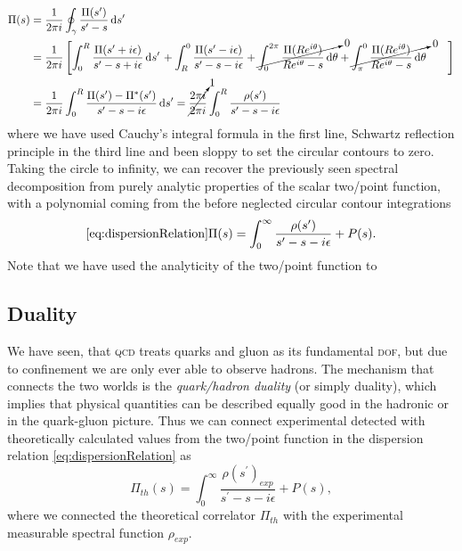 \documentclass[../../index.tex]{subfiles}
\begin{document}
\begin{equation}
  \begin{split}
    \Pi(s) &= \frac{1}{2\pi i}\oint_\gamma \frac{\Pi(s^\prime)}{s^\prime-s} \dif s^\prime \\
    &= \frac{1}{2\pi i} \left[ \int_0^R
      \frac{\Pi(s^\prime+i\epsilon)}{s^\prime-s+i\epsilon}\dif s^\prime \right.
    + \int_R^0 \frac{\Pi(s^\prime - i\epsilon)}{s^\prime-s-i\epsilon} +
    \cancelto{0}{\int_0^{2\pi} \frac{\Pi(R e^{i\theta})}{Re^{i\theta}-s}\dif
      \theta}
    + \cancelto{0}{ \int_\pi^0 \frac{\Pi(R e^{i\theta})}{Re^{i\theta}-s}\dif \theta} \left. \phantom{\int_0^R} \right] \\
    &= \frac{1}{2\pi i}\int_0^R \frac{\Pi(s^\prime) -
      \Pi^*(s^\prime)}{s^\prime-s-i\epsilon} \dif s^\prime =
    \cancelto{1}{\frac{2 \pi i}{2 \pi i}}\int_0^R
    \frac{\rho(s^\prime)}{s^\prime-s-i\epsilon}
  \end{split}
\end{equation}
where we have used Cauchy's integral formula in the first line, Schwartz
reflection principle in the third line and been sloppy to set the circular
contours to zero. Taking the circle to infinity, we can recover the previously
seen spectral decomposition from purely analytic properties of the scalar
two\-/point function, with a polynomial coming from the before neglected
circular contour integrations
\begin{equation}
  \cref{eq:dispersionRelation}
  \Pi(s) = \int_0^\infty \frac{\rho(s^\prime)}{s^\prime-s-i\epsilon} + P(s).
\end{equation}
Note that we have used the analyticity of the two\-/point function to

\subsection{Duality}
We have seen, that \textsc{qcd} treats quarks and gluon as its fundamental
\textsc{dof}, but due to confinement we are only ever able to observe hadrons.
The mechanism that connects the two worlds is the \textit{quark\-/hadron
  duality} (or simply duality), which implies that physical quantities can be
described equally good in the hadronic or in the quark-gluon picture. Thus we
can connect experimental detected with theoretically calculated values from the
two\-/point function in the dispersion relation \cref{eq:dispersionRelation} as
\begin{equation}
  \Pi_{th}(s) = \int_0^\infty \frac{\rho(s^\prime)_{exp}}{s^\prime-s-i\epsilon} + P(s),
\end{equation}
where we connected the theoretical correlator $\Pi_{th}$ with the experimental
measurable spectral function $\rho_{exp}$.
\end{document}
